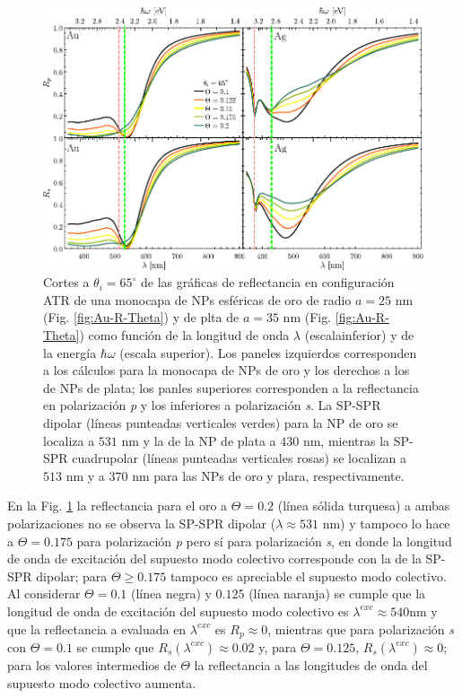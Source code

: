 \begin{figure}[h!]\centering
	\includegraphics[scale=1]{2-Resultados/figs/6-AuThetaVar/0-cut65_Au_Aug.pdf}\vspace*{-.5em}
	\caption{Cortes a $\theta_i = 65^\circ$ de las gráficas de reflectancia  en configuración ATR  de una monocapa de NPs esféricas de oro de radio $a=25$ nm (Fig. \ref{fig:Au-R-Theta}) y de plta de $a=35$ nm (Fig. \ref{fig:Au-R-Theta}) como función de la longitud de onda $\lambda$ (escalainferior) y de la energía $\hbar\omega$ (escala superior). Los paneles izquierdos corresponden a los cálculos para la monocapa de NPs de oro y los derechos a los de NPs de plata; los panles superiores corresponden a la reflectancia en polarización \emph{p} y los inferiores a polarización \emph{s}. La SP-SPR dipolar (líneas punteadas verticales verdes) para la NP de oro se localiza a $531$ nm y la de la NP de plata a $430$ nm, mientras la SP-SPR cuadrupolar (líneas punteadas verticales rosas) se localizan a $513$ nm y a $370$ nm para las NPs de oro y plara, respectivamente. }\label{fig:AuAg-Cuts-65}
	\end{figure}	
	
En la Fig. \ref{fig:AuAg-Cuts-65} la reflectancia  para el oro a $\Theta=0.2$  (línea  sólida turquesa) a ambas polarizaciones no se observa la SP-SPR dipolar ($\lambda\approx531$ nm) y tampoco lo hace a $\Theta=0.175$ para polarización \emph{p} pero sí para polarización \emph{s}, en donde la longitud de onda de excitación del supuesto modo colectivo corresponde con la de la SP-SPR dipolar; para $\Theta\geq 0.175$ tampoco es apreciable el supuesto modo colectivo. Al considerar $\Theta= 0.1$ (línea negra)  y $0.125$ (línea naranja)  se cumple que la longitud de onda de excitación del supuesto modo colectivo es $\lambda^{exc} \approx 540\text {nm}$ y que la reflectancia a evaluada en $\lambda^{exc}$ es $R_p\approx 0$, mientras que  para polarización \emph{s} con $\Theta=0.1$ se cumple que $R_s(\lambda^{exc}) \approx0.02$ y, para $\Theta=0.125$, $R_s(\lambda^{exc})\approx 0$; para los valores intermedios de $\Theta$ la reflectancia a las longitudes de onda del supuesto modo colectivo aumenta.

